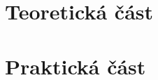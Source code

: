\documentclass[a4paper,12pt]{report}	%
\begin{document}
\chapter{Teoretická část}




\chapter{Praktická část}





%


\nocite{*}				%





\end{document}
